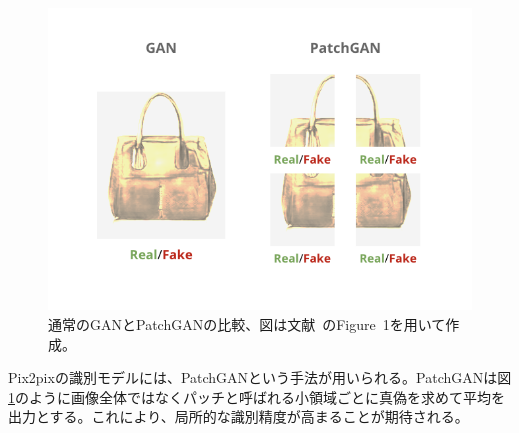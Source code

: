 \begin{figure}[t]
\begin{center}
\includegraphics[width=0.95\hsize]{figure/patchgan.png}
\caption{通常のGANとPatchGANの比較、図は文献~\cite{pix2pix}のFigure~1を用いて作成。}
\label{fig:patchgan}
\end{center}
\end{figure}

Pix2pixの識別モデルには、PatchGANという手法が用いられる。PatchGANは図\ref{fig:patchgan}のように画像全体ではなくパッチと呼ばれる小領域ごとに真偽を求めて平均を出力とする。これにより、局所的な識別精度が高まることが期待される。